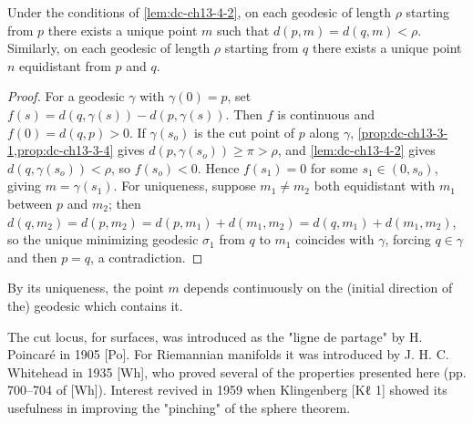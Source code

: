 \begin{lemma}
  \label{lem:dc-ch13-4-3}
  Under the conditions of \cref{lem:dc-ch13-4-2}, on each geodesic of length $\rho$ starting from
  $p$ there exists a unique point $m$ such that $d(p,m)=d(q,m)<\rho$. Similarly, on
  each geodesic of length $\rho$ starting from $q$ there exists a unique point $n$
  equidistant from $p$ and $q$.
\end{lemma}
\begin{proof}
\sketch
  For a geodesic $\gamma$ with $\gamma(0)=p$, set
  $f(s)=d(q,\gamma(s))-d(p,\gamma(s))$. Then $f$ is continuous and $f(0)=d(q,p)>0$. If
  $\gamma(s_o)$ is the cut point of $p$ along $\gamma$,
  \cref{prop:dc-ch13-3-1,prop:dc-ch13-3-4} gives
  $d(p,\gamma(s_o))\geq\pi>\rho$, and
  \cref{lem:dc-ch13-4-2} gives $d(q,\gamma(s_o))<\rho$, so $f(s_o)<0$. Hence $f(s_1)=0$ for some
  $s_1\in(0,s_o)$, giving $m=\gamma(s_1)$. For uniqueness, suppose $m_1\neq m_2$ both
  equidistant with $m_1$ between $p$ and $m_2$; then
  $d(q,m_2)=d(p,m_2)=d(p,m_1)+d(m_1,m_2)=d(q,m_1)+d(m_1,m_2)$, so the unique minimizing
  geodesic $\sigma_1$ from $q$ to $m_1$ coincides with $\gamma$, forcing $q\in\gamma$
  and then $p=q$, a contradiction.
\end{proof}

\begin{remark}
  \label{rem:dc-ch13-4-4}
  By its uniqueness, the point $m$ depends continuously on the (initial direction of
  the) geodesic which contains it.
\end{remark}

\begin{remark}[Remark 2.1]
  \label{rem:dc-ch13-2-1}
  The cut locus, for surfaces, was introduced as the "ligne de partage" by
  H. Poincaré in 1905 [Po]. For Riemannian manifolds it was introduced by
  J. H. C. Whitehead in 1935 [Wh], who proved several of the properties presented
  here (pp. 700–704 of [Wh]). Interest revived in 1959 when Klingenberg [Kℓ 1]
  showed its usefulness in improving the "pinching" of the sphere theorem.
\end{remark}
